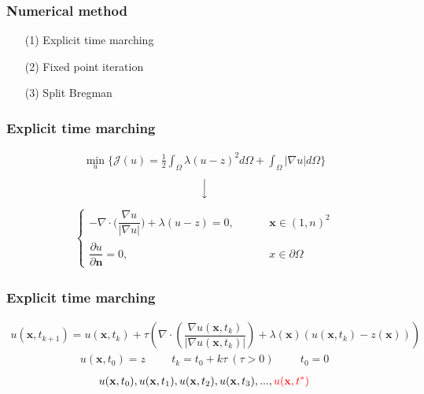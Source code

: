 \documentclass[xcolor=dvipsnames, xetex,serif]{beamer}
\begin{document}
    \begin{frame}
        \frametitle{Numerical method}
        \begin{itemize}
            \item[(1)] Explicit time marching
            \item[(2)] Fixed point iteration
            \item[(3)] Split Bregman
        \end{itemize}
    \end{frame}
    \begin{frame}
		\frametitle{Explicit time marching}
		\begin{align*}
		\min_{u} \{ \mathcal{J}(u) = \frac{1}{2} \int_{\Omega}\lambda (u-z)^2 d\Omega +  \int_{\Omega}  |\nabla u|  d\Omega \}
		\end{align*}
		$$ \Big \downarrow$$
		\begin{align*}
		\left \{ \begin{array}{ll}  - \nabla \cdot  \Big( \dfrac{\nabla u}{|\nabla u|} \Big) + \lambda (u-z) = 0,  & \hspace{1cm} \mathbf{x} \in (1,n)^2 \\ \dfrac{\partial u}{\partial \boldsymbol{n}} = 0, & \hspace{1cm} x \in \partial \Omega \end{array} \right .
        \end{align*}
        \let\thefootnote\relax{}						
    \end{frame} 
    \begin{frame}
        \frametitle{Explicit time marching}
        \begin{align*}
        u(\mathbf{x},t_{k+1})=u(\mathbf{x},t_{k})+\tau\left(\nabla \cdot\left(\dfrac{\nabla u (\mathbf{x},t_k)}{| \nabla u (\mathbf{x},t_k) | }\right) + \lambda(\mathbf{x})(u (\mathbf{x},t_k)-z(\mathbf{x})) \right)
        \end{align*}
        \begin{align*}
        u(\mathbf{x},t_0)=z \hspace{1cm} t_k=t_0+k\tau\ (\tau>0)  \hspace{1cm}  t_0=0
        \end{align*}
        \vspace{1cm}
        \begin{align*}
            u(\mathbf{x},t_0), u(\mathbf{x},t_1), u(\mathbf{x},t_2), u(\mathbf{x},t_3), ... ,  \textcolor{red}{u(\mathbf{x},t^{*})}
        \end{align*}
    \end{frame} 
\end{document}
